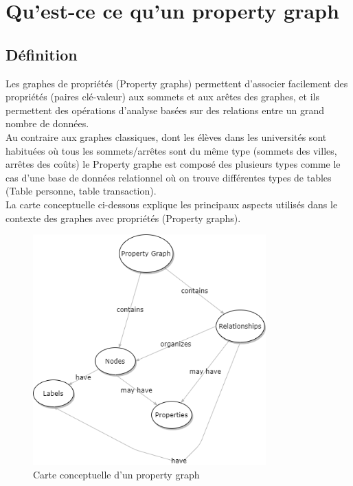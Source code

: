 \section{Qu’est-ce ce qu’un property graph}
\subsection{Définition}

Les graphes de propriétés (Property graphs) permettent d'associer facilement des propriétés (paires clé-valeur) aux sommets et aux arêtes des graphes, et ils permettent des opérations d'analyse basées sur des relations entre un grand nombre de données.\\
Au contraire aux graphes classiques, dont les élèves dans les universités sont habituées où tous les sommets/arrêtes sont du même type (sommets des villes, arrêtes des coûts) le Property graphe est composé des plusieurs types comme le cas d’une base de données relationnel où on trouve différentes types de tables (Table personne, table transaction).\\
La carte conceptuelle ci-dessous explique les principaux aspects utilisés dans le contexte des graphes avec propriétés (Property graphs).\\

\begin{figure}[h!]  
  \centering
    \includegraphics[width=0.8\textwidth]{chapitre2/Figures/PropertyGraph.png}
  \caption{Carte conceptuelle d'un property graph}
\end{figure}

